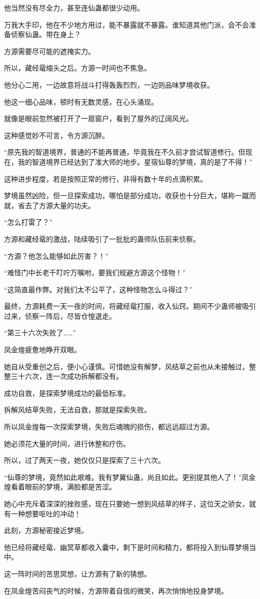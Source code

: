 \begin{this_body}
他当然没有尽全力，甚至连仙蛊都很少动用。

万我大手印，他在不少地方用过，能不暴露就不暴露。谁知道其他门派，会不会准备侦察仙蛊。带在身上？

方源需要尽可能的遮掩实力。

所以，藏经鼋缩头之后。方源一时间也不焦急。

他分心二用，一边故意将战斗打得轰轰烈烈，一边则品味梦境收获。

他这一细心品味，顿时有无数灵感，在心头涌现。

就像是眼前忽然被打开了一扇窗户，看到了屋外的辽阔风光。

这种感觉妙不可言，令方源沉醉。

“原先我的智道境界，普通的不能再普通，毕竟我在不久前才尝试智道修行。但现在，我的智道境界已经达到了准大师的地步。星宿仙尊的梦境，真的是了不得！”

这种进步程度，若是按照正常的修行，非得有数十年的点滴积累。

梦境虽然凶险，但一旦探索成功，哪怕是部分成功，收获也十分巨大，堪称一蹴而就，省去了方源大量的功夫。

“怎么打雷了？”

方源和藏经鼋的激战，陆续吸引了一批批的蛊师队伍前来侦察。

“方源？他怎么能够如此厉害？！”

“难怪门中长老千叮咛万嘱咐，要我们规避方源这个怪物！”

“这简直最作弊。对我们太不公平了，这种怪物怎么斗得过？”

最终，方源耗费一天一夜的时间，将藏经鼋打服，收入仙窍。期间不少蛊师被吸引过来，侦察一阵后，尽皆仓惶退走。

“第三十六次失败了……”

凤金煌疲惫地睁开双眼。

她自从受重创之后，便小心谨慎。可惜她没有解梦，风结草之前也从未接触过，整整三十六次，连一次成功拆解都没有。

成功自救，是探索梦境成功的最低标准。

拆解风结草失败，无法自救，那就是探索失败。

所以凤金煌每一次探索梦境，失败后魂魄的损伤，都远远超过方源。

她必须花大量的时间，进行休整和疗伤。

所以，过了两天一夜，她仅仅只是探索了三十六次。

“仙尊的梦境，竟然如此艰难。我有梦翼仙蛊，尚且如此。更别提其他人了！”凤金煌看着眼前的梦境，满脸都是苦涩。

她心中充斥着深深的挫败感，现在只要她一想到风结草的样子，这位天之骄女，就有一种想要呕吐的冲动！

此刻，方源秘密接近梦境。

他已经将藏经鼋、幽冥草都收入囊中，剩下是时间和精力，都将投入到仙尊梦境当中。

这一阵时间的苦思冥想，让方源有了新的猜想。

在凤金煌苦闷丧气的时候，方源带着自信的微笑，再次悄悄地投身梦境。

\end{this_body}

